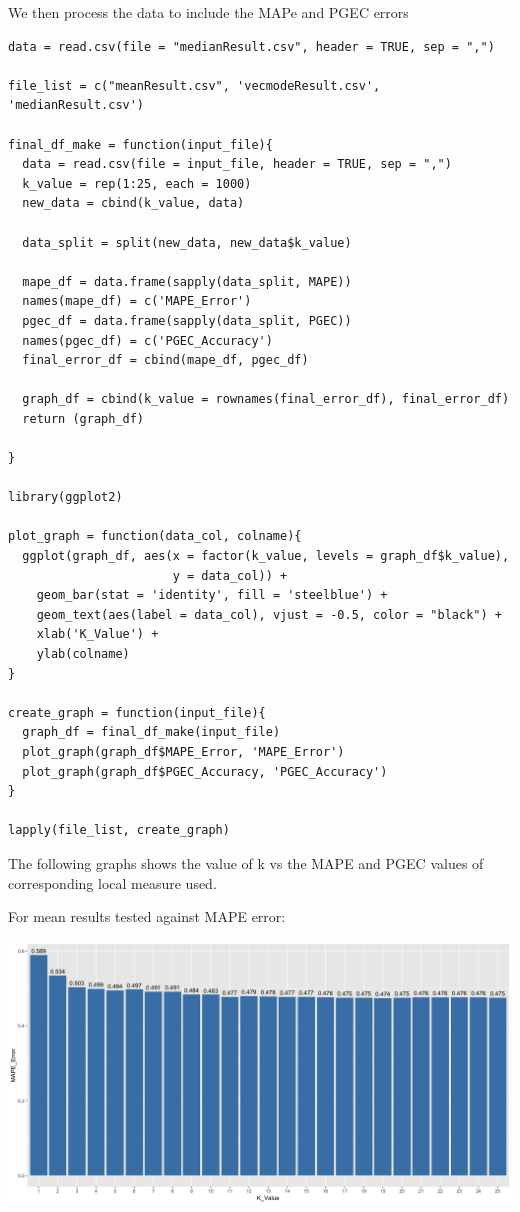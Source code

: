 \documentclass{article}
\begin{document}
We then process the data to include the MAPe and PGEC errors
\begin{verbatim}
data = read.csv(file = "medianResult.csv", header = TRUE, sep = ",")

file_list = c("meanResult.csv", 'vecmodeResult.csv', 'medianResult.csv')

final_df_make = function(input_file){
  data = read.csv(file = input_file, header = TRUE, sep = ",")
  k_value = rep(1:25, each = 1000)
  new_data = cbind(k_value, data)
  
  data_split = split(new_data, new_data$k_value)
  
  mape_df = data.frame(sapply(data_split, MAPE))
  names(mape_df) = c('MAPE_Error')
  pgec_df = data.frame(sapply(data_split, PGEC))
  names(pgec_df) = c('PGEC_Accuracy')
  final_error_df = cbind(mape_df, pgec_df)
  
  graph_df = cbind(k_value = rownames(final_error_df), final_error_df)
  return (graph_df)
  
}

library(ggplot2)

plot_graph = function(data_col, colname){
  ggplot(graph_df, aes(x = factor(k_value, levels = graph_df$k_value), 
                       y = data_col)) + 
    geom_bar(stat = 'identity', fill = 'steelblue') + 
    geom_text(aes(label = data_col), vjust = -0.5, color = "black") +
    xlab('K_Value') +
    ylab(colname)
}

create_graph = function(input_file){
  graph_df = final_df_make(input_file)
  plot_graph(graph_df$MAPE_Error, 'MAPE_Error')
  plot_graph(graph_df$PGEC_Accuracy, 'PGEC_Accuracy')
}

lapply(file_list, create_graph)
\end{verbatim}

The following graphs shows the value of k vs the MAPE and PGEC values of corresponding local measure used.

For mean results tested against MAPE error:

\includegraphics[scale=0.25]{Mean-MAPE.png}
\end{document}

